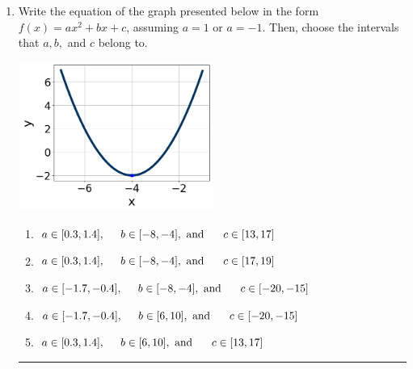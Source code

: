 \documentclass[14pt]{extbook}
\newcommand{\litem}[1]{\item#1\hspace*{-1cm}\rule{\textwidth}{0.4pt}}
\begin{document}
\begin{enumerate}
{\begin{enumerate}[label=\Alph*.]
\end{enumerate} }
\litem{
Write the equation of the graph presented below in the form $f(x)=ax^2+bx+c$, assuming  $a=1$ or $a=-1$. Then, choose the intervals that $a, b,$ and $c$ belong to.
\begin{center}
    \includegraphics[width=0.5\textwidth]{../Figures/quadraticGraphToEquationC.png}
\end{center}
\begin{enumerate}[label=\Alph*.]
\item \( a \in [0.3, 1.4], \hspace*{5mm} b \in [-8, -4], \text{ and } \hspace*{5mm} c \in [13, 17] \)
\item \( a \in [0.3, 1.4], \hspace*{5mm} b \in [-8, -4], \text{ and } \hspace*{5mm} c \in [17, 19] \)
\item \( a \in [-1.7, -0.4], \hspace*{5mm} b \in [-8, -4], \text{ and } \hspace*{5mm} c \in [-20, -15] \)
\item \( a \in [-1.7, -0.4], \hspace*{5mm} b \in [6, 10], \text{ and } \hspace*{5mm} c \in [-20, -15] \)
\item \( a \in [0.3, 1.4], \hspace*{5mm} b \in [6, 10], \text{ and } \hspace*{5mm} c \in [13, 17] \)


\end{enumerate}}
\end{enumerate}
\end{document}
